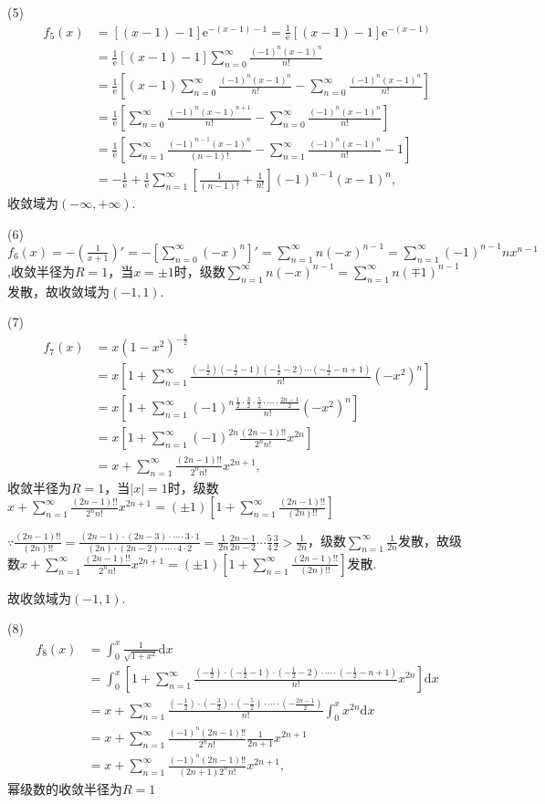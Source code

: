 \documentclass[12pt,UTF8]{ctexart}
\newcommand\Ser[1]{\sum_{n=#1}^\infty}
\begin{document}
\begin{enumerate}
(5)\[\begin{split}
f_5(x)&=[(x-1)-1]\mathrm e^{-(x-1)-1}=\frac1{\mathrm e}[(x-1)-1]\mathrm e^{-(x-1)}\\
&=\frac1{\mathrm e}[(x-1)-1]\Ser{0}\frac{(-1)^n(x-1)^n}{n!}\\
&=\frac1{\mathrm e}[(x-1)\Ser{0}\frac{(-1)^n(x-1)^n}{n!}-\Ser{0}\frac{(-1)^n(x-1)^n}{n!}]\\
&=\frac1{\mathrm e}[\Ser{0}\frac{(-1)^n(x-1)^{n+1}}{n!}-\Ser{0}\frac{(-1)^n(x-1)^n}{n!}]\\
&=\frac1{\mathrm e}[\Ser{1}\frac{(-1)^{n-1}(x-1)^n}{(n-1)!}-\Ser{1}\frac{(-1)^n(x-1)^n}{n!}-1]\\
&=-\frac1{\mathrm e}+\frac1{\mathrm e}\Ser{1}[\frac1{(n-1)!}+\frac1{n!}](-1)^{n-1}(x-1)^n,
\end{split}\]
收敛域为$(-\infty,+\infty)$.

(6)$f_6(x)=-(\frac1{x+1})'=-[\Ser{0}(-x)^n]'=\Ser{1}n(-x)^{n-1}=\Ser{1}(-1)^{n-1}nx^{n-1}$,收敛半径为$R=1$，当$x=\pm1$时，级数$\Ser{1}n(-x)^{n-1}=\Ser{1}n(\mp1)^{n-1}$发散，故收敛域为$(-1,1)$.

(7)\[\begin{split}
f_7(x)&=x(1-x^2)^{-\frac12}\\
&=x[1+\Ser{1}\frac{(-\frac12)(-\frac12-1)(-\frac12-2)\cdots(-\frac12-n+1)}{n!}(-x^2)^n]\\
&=x[1+\Ser{1}(-1)^n\frac{\frac12\cdot\frac32\cdot\frac52\cdot\cdots\cdot\frac{2n-1}2}{n!}(-x^2)^n]\\
&=x[1+\Ser{1}(-1)^{2n}\frac{(2n-1)!!}{2^nn!}x^{2n}]\\
&=x+\Ser{1}\frac{(2n-1)!!}{2^nn!}x^{2n+1},
\end{split}\]
收敛半径为$R=1$，当$|x|=1$时，级数$x+\Ser{1}\frac{(2n-1)!!}{2^nn!}x^{2n+1}=(\pm1)[1+\Ser{1}\frac{(2n-1)!!}{(2n)!!}]$

$\because\frac{(2n-1)!!}{(2n)!!}=\frac{(2n-1)\cdot(2n-3)\cdot\cdots\cdot3\cdot1}{(2n)\cdot(2n-2)\cdot\cdots\cdot4\cdot2}=\frac1{2n}\frac{2n-1}{2n-2}\cdots\frac54\frac32>\frac1{2n}$，级数$\Ser{1}\frac1{2n}$发散，故级数$x+\Ser{1}\frac{(2n-1)!!}{2^nn!}x^{2n+1}=(\pm1)[1+\Ser{1}\frac{(2n-1)!!}{(2n)!!}]$发散.

故收敛域为$(-1,1)$.

(8)\[\begin{split}
f_8(x)&=\int_0^x\frac1{\sqrt{1+x^2}}\mathrm dx\\
&=\int_0^x[1+\Ser{1}\frac{(-\frac12)\cdot(-\frac12-1)\cdot(-\frac12-2)\cdot\cdots\cdot(-\frac12-n+1)}{n!}x^{2n}]\mathrm dx\\
&=x+\Ser{1}\frac{(-\frac12)\cdot(-\frac32)\cdot(-\frac52)\cdot\cdots\cdot(-\frac{2n-1}2)}{n!}\int_0^xx^{2n}\mathrm dx\\
&=x+\Ser{1}\frac{(-1)^n(2n-1)!!}{2^nn!}\frac1{2n+1}x^{2n+1}\\
&=x+\Ser{1}\frac{(-1)^n(2n-1)!!}{(2n+1)2^nn!}x^{2n+1},
\end{split}\]
幂级数的收敛半径为$R=1$


\end{enumerate}
\end{document}
